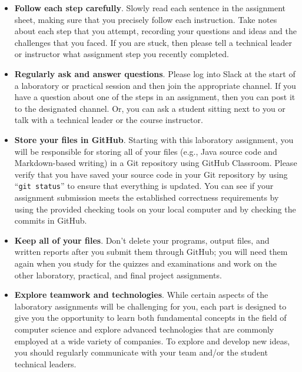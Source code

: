 \documentclass[11pt]{article}
\newcommand{\command}[1]{``\lstinline{#1}''}
\begin{document}
\begin{itemize}
  \setlength{\itemsep}{0pt}

\item {\bf Follow each step carefully}. Slowly read each sentence in the
  assignment sheet, making sure that you precisely follow each instruction. Take
  notes about each step that you attempt, recording your questions and ideas and
  the challenges that you faced. If you are stuck, then please tell a technical
  leader or instructor what assignment step you recently completed.

\item {\bf Regularly ask and answer questions}. Please log into Slack at the
  start of a laboratory or practical session and then join the appropriate
  channel. If you have a question about one of the steps in an assignment, then
  you can post it to the designated channel. Or, you can ask a student sitting
  next to you or talk with a technical leader or the course instructor.

\item {\bf Store your files in GitHub}. Starting with this laboratory
  assignment, you will be responsible for storing all of your files (e.g., Java
  source code and Markdown-based writing) in a Git repository using GitHub
  Classroom. Please verify that you have saved your source code in your Git
  repository by using \command{git status} to ensure that everything is
  updated. You can see if your assignment submission meets the established
  correctness requirements by using the provided checking tools on your local
  computer and by checking the commits in GitHub.

\item {\bf Keep all of your files}. Don't delete your programs, output files,
  and written reports after you submit them through GitHub; you will need them
  again when you study for the quizzes and examinations and work on the other
  laboratory, practical, and final project assignments.

\item {\bf Explore teamwork and technologies}. While certain aspects of the
  laboratory assignments will be challenging for you, each part is designed to
  give you the opportunity to learn both fundamental concepts in the field of
  computer science and explore advanced technologies that are commonly employed
  at a wide variety of companies. To explore and develop new ideas, you should
  regularly communicate with your team and/or the student technical leaders.


\end{itemize}
\end{document}
